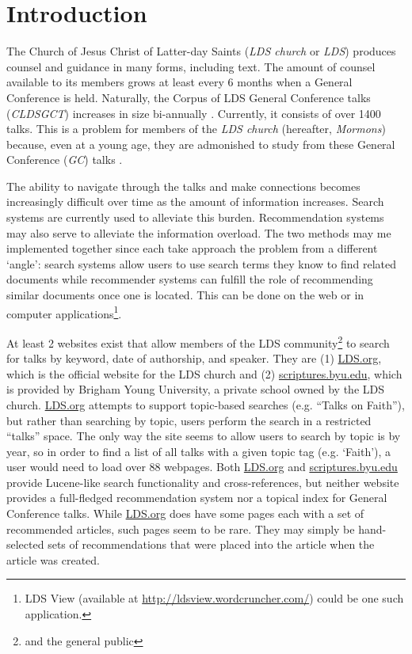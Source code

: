 \chapter{Introduction} \label{chp:introduction}

The Church of Jesus Christ of Latter-day Saints (\emph{LDS church} or \emph{LDS}) produces counsel and guidance in many forms, including text. The amount of counsel available to its members grows at least every 6 months when a General Conference is held. Naturally, the Corpus of LDS General Conference talks (\emph{CLDSGCT}) increases in size bi-annually \citep{davies:gc}. Currently, it consists of over 1400 talks. This is a problem for members of the \emph{LDS church} (hereafter, \emph{Mormons}) because, even at a young age, they are admonished to study from these General Conference (\emph{GC}) talks \citep{childrens_songbook}.

The ability to navigate through the talks and make connections becomes increasingly difficult over time as the amount of information increases. Search systems are currently used to alleviate this burden. Recommendation systems may also serve to alleviate the information overload. The two methods may me implemented together since each take approach the problem from a different `angle': search systems allow users to use search terms they know to find related documents while recommender systems can fulfill the role of recommending similar documents once one is located. This can be done on the web or in computer applications\footnote{LDS View (available at \url{http://ldsview.wordcruncher.com/}) could be one such application.}.

At least 2 websites exist that allow members of the LDS community\footnote{and the general public} to search for talks by keyword, date of authorship, and speaker. They are (1) \url{LDS.org}, which is the official website for the LDS church and (2) \url{scriptures.byu.edu}, which is provided by Brigham Young University, a private school owned by the LDS church. \url{LDS.org} attempts to support topic-based searches (e.g. ``Talks on Faith''), but rather than searching by topic, users perform the search in a restricted ``talks'' space. The only way the site seems to allow users to search by topic is by year, so in order to find a list of all talks with a given topic tag (e.g. `Faith'), a user would need to load over 88 webpages. Both \url{LDS.org} and \url{scriptures.byu.edu} provide Lucene-like search functionality \citep{McCandless:2010:LAS:1893016,lucene:luke} and cross-references, but neither website provides a full-fledged recommendation system nor a topical index for General Conference talks. While \url{LDS.org} does have some pages each with a set of recommended articles, such pages seem to be rare. They may simply be hand-selected sets of recommendations that were placed into the article when the article was created.

